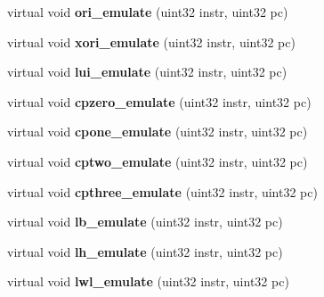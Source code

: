 \begin{DoxyCompactItemize}
\item 
\hypertarget{classCPU_a881a19abc96daf5b3a010660f9f36e81}{
virtual void {\bfseries ori\_\-emulate} (uint32 instr, uint32 pc)}
\label{classCPU_a881a19abc96daf5b3a010660f9f36e81}

\item 
\hypertarget{classCPU_a76461399b3717c9feac047162f95824b}{
virtual void {\bfseries xori\_\-emulate} (uint32 instr, uint32 pc)}
\label{classCPU_a76461399b3717c9feac047162f95824b}

\item 
\hypertarget{classCPU_ab3bb4e55218c71542705abacc85cbbef}{
virtual void {\bfseries lui\_\-emulate} (uint32 instr, uint32 pc)}
\label{classCPU_ab3bb4e55218c71542705abacc85cbbef}

\item 
\hypertarget{classCPU_aab8c941ebf88267b842c8b63092c7df8}{
virtual void {\bfseries cpzero\_\-emulate} (uint32 instr, uint32 pc)}
\label{classCPU_aab8c941ebf88267b842c8b63092c7df8}

\item 
\hypertarget{classCPU_a221f6f3223e32a3b1f3b3d4c68628aac}{
virtual void {\bfseries cpone\_\-emulate} (uint32 instr, uint32 pc)}
\label{classCPU_a221f6f3223e32a3b1f3b3d4c68628aac}

\item 
\hypertarget{classCPU_ae338c1e5c3bc11c4f33bc7654b76edd4}{
virtual void {\bfseries cptwo\_\-emulate} (uint32 instr, uint32 pc)}
\label{classCPU_ae338c1e5c3bc11c4f33bc7654b76edd4}

\item 
\hypertarget{classCPU_a55223ec98f748ce379420d4eba934dbf}{
virtual void {\bfseries cpthree\_\-emulate} (uint32 instr, uint32 pc)}
\label{classCPU_a55223ec98f748ce379420d4eba934dbf}

\item 
\hypertarget{classCPU_a7f7353bd53ccdbd154658895ccb1790b}{
virtual void {\bfseries lb\_\-emulate} (uint32 instr, uint32 pc)}
\label{classCPU_a7f7353bd53ccdbd154658895ccb1790b}

\item 
\hypertarget{classCPU_a2431d002e82968109f1dc358c3e33ef7}{
virtual void {\bfseries lh\_\-emulate} (uint32 instr, uint32 pc)}
\label{classCPU_a2431d002e82968109f1dc358c3e33ef7}

\item 
\hypertarget{classCPU_ac1db353a9a93c7e47aa1f410bc23fec3}{
virtual void {\bfseries lwl\_\-emulate} (uint32 instr, uint32 pc)}
\label{classCPU_ac1db353a9a93c7e47aa1f410bc23fec3}


\end{DoxyCompactItemize}
